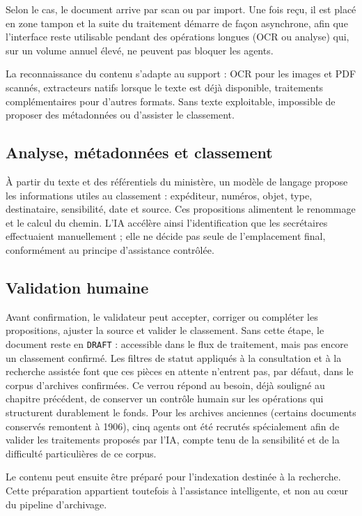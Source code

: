 Selon le cas, le document arrive par scan ou par import. Une fois reçu, il est placé en zone tampon et la suite du traitement démarre de façon asynchrone, afin que l'interface reste utilisable pendant des opérations longues (OCR ou analyse) qui, sur un volume annuel élevé, ne peuvent pas bloquer les agents.

La reconnaissance du contenu s'adapte au support : OCR pour les images et PDF scannés, extracteurs natifs lorsque le texte est déjà disponible, traitements complémentaires pour d'autres formats. Sans texte exploitable, impossible de proposer des métadonnées ou d'assister le classement.

\subsection{Analyse, métadonnées et classement}

À partir du texte et des référentiels du ministère, un modèle de langage propose les informations utiles au classement : expéditeur, numéros, objet, type, destinataire, sensibilité, date et source. Ces propositions alimentent le renommage et le calcul du chemin. L'IA accélère ainsi l'identification que les secrétaires effectuaient manuellement ; elle ne décide pas seule de l'emplacement final, conformément au principe d'assistance contrôlée.

\subsection{Validation humaine}

Avant confirmation, le validateur peut accepter, corriger ou compléter les propositions, ajuster la source et valider le classement. Sans cette étape, le document reste en \texttt{DRAFT} : accessible dans le flux de traitement, mais pas encore un classement confirmé. Les filtres de statut appliqués à la consultation et à la recherche assistée font que ces pièces en attente n'entrent pas, par défaut, dans le corpus d'archives confirmées. Ce verrou répond au besoin, déjà souligné au chapitre précédent, de conserver un contrôle humain sur les opérations qui structurent durablement le fonds. Pour les archives anciennes (certains documents conservés remontent à 1906), cinq agents ont été recrutés spécialement afin de valider les traitements proposés par l'IA, compte tenu de la sensibilité et de la difficulté particulières de ce corpus.

Le contenu peut ensuite être préparé pour l'indexation destinée à la recherche. Cette préparation appartient toutefois à l'assistance intelligente, et non au cœur du pipeline d'archivage.

